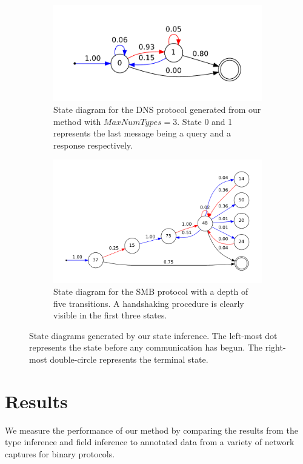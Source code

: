 \documentclass[a4paper]{report}
\begin{document}
\begin{figure}[h]
    \centering
    \begin{subfigure}[b]{0.48\textwidth}
        \includegraphics[width=\textwidth]{img/dnsstate}
        \caption{State diagram for the DNS protocol generated from our
        method with $MaxNumTypes = 3$. State 0 and 1 represents the last message
        being a query and a response respectively.}
        \label{fig:dnsstate}
    \end{subfigure}
    \quad
    \begin{subfigure}[b]{0.48\textwidth}
        \includegraphics[width=\textwidth]{img/smbstate}
        \caption{State diagram for the SMB protocol with a depth of five
        transitions. A handshaking procedure is clearly visible in the first
        three states.}
        \label{fig:smbstate}
    \end{subfigure}
    \caption{State diagrams generated by our state inference. The left-most
        dot represents the state before any communication has begun. The
        right-most double-circle represents the terminal state.}
    \label{fig:states}
\end{figure}

\chapter{Results}
We measure the performance of our method by comparing the results from the
type inference and field inference to annotated data from a variety of network
captures for binary protocols.
\end{document}
